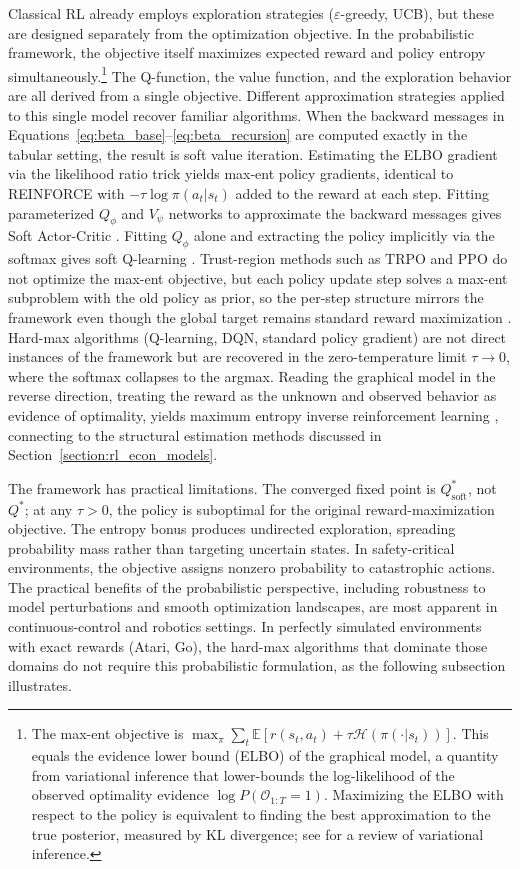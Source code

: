 Classical RL already employs exploration strategies ($\varepsilon$-greedy, UCB), but these are designed separately from the optimization objective. In the probabilistic framework, the objective itself maximizes expected reward and policy entropy simultaneously.\footnote{The max-ent objective is $\max_\pi \sum_t \mathbb{E}[r(s_t,a_t) + \tau \mathcal{H}(\pi(\cdot|s_t))]$. This equals the evidence lower bound (ELBO) of the graphical model, a quantity from variational inference that lower-bounds the log-likelihood of the observed optimality evidence $\log P(\mathcal{O}_{1:T} = 1)$. Maximizing the ELBO with respect to the policy is equivalent to finding the best approximation to the true posterior, measured by KL divergence; see \citet{BleiKucukelbirMcAuliffe2017} for a review of variational inference.} The Q-function, the value function, and the exploration behavior are all derived from a single objective. Different approximation strategies applied to this single model recover familiar algorithms. When the backward messages in Equations~\eqref{eq:beta_base}--\eqref{eq:beta_recursion} are computed exactly in the tabular setting, the result is soft value iteration. Estimating the ELBO gradient via the likelihood ratio trick yields max-ent policy gradients, identical to REINFORCE with $-\tau \log \pi(a_t|s_t)$ added to the reward at each step. Fitting parameterized $Q_\phi$ and $V_\psi$ networks to approximate the backward messages gives Soft Actor-Critic \citep{Haarnoja2018}. Fitting $Q_\phi$ alone and extracting the policy implicitly via the softmax gives soft Q-learning \citep{Haarnoja2017}. Trust-region methods such as TRPO and PPO do not optimize the max-ent objective, but each policy update step solves a max-ent subproblem with the old policy as prior, so the per-step structure mirrors the framework even though the global target remains standard reward maximization \citep{Schulman2015, Schulman2017}. Hard-max algorithms (Q-learning, DQN, standard policy gradient) are not direct instances of the framework but are recovered in the zero-temperature limit $\tau \to 0$, where the softmax collapses to the argmax. Reading the graphical model in the reverse direction, treating the reward as the unknown and observed behavior as evidence of optimality, yields maximum entropy inverse reinforcement learning \citep{Ziebart2008}, connecting to the structural estimation methods discussed in Section~\ref{section:rl_econ_models}.

The framework has practical limitations. The converged fixed point is $Q^*_{\mathrm{soft}}$, not $Q^*$; at any $\tau > 0$, the policy is suboptimal for the original reward-maximization objective. The entropy bonus produces undirected exploration, spreading probability mass rather than targeting uncertain states. In safety-critical environments, the objective assigns nonzero probability to catastrophic actions. The practical benefits of the probabilistic perspective, including robustness to model perturbations and smooth optimization landscapes, are most apparent in continuous-control and robotics settings. In perfectly simulated environments with exact rewards (Atari, Go), the hard-max algorithms that dominate those domains do not require this probabilistic formulation, as the following subsection illustrates.

